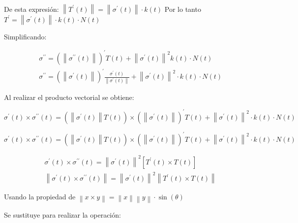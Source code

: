 De esta expresión: $\left\lVert T^{\prime}(t)\right\rVert = \left\lVert \sigma^{\prime}(t)\right\rVert \cdot k(t)$
Por lo tanto $T^{\prime}=\left\lVert \sigma^{\prime}(t)\right\rVert \cdot k(t)\cdot N(t)$

Simplificando:

\begin{align*}
	 & \sigma^{\prime\prime}=\left(\left\lVert \sigma^{\prime\prime}(t)\right\rVert \right)^{\prime}T(t)+\left\lVert \sigma^{\prime}(t)\right\rVert^{2}k(t)\cdot N(t)                                                                   \\
	 & \sigma^{\prime\prime}=\left(\left\lVert \sigma^{\prime}(t)\right\rVert \right)^{\prime}\frac{\sigma^{\prime}(t)}{\left\lVert \sigma^{\prime}(t)\right\rVert }+\left\lVert \sigma^{\prime}(t)\right\rVert^{2}\cdot k(t)\cdot N(t)
\end{align*}

Al realizar el producto vectorial se obtiene:

\begin{equation*}
	\sigma^{\prime}(t)\times \sigma^{\prime\prime}(t)=\left(\left\lVert \sigma^{\prime}(t)\right\rVert T(t)\right)\times \left(\left\lVert \sigma^{\prime}(t)\right\rVert \right)^{\prime}T(t)+\left\lVert\sigma^{\prime}(t)\right\rVert^{2}\cdot k(t)\cdot N(t)
\end{equation*}

\begin{equation*}
	\sigma^{\prime}(t)\times \sigma^{\prime\prime}(t)=\left(\left\lVert \sigma^{\prime}(t)\right\rVert T(t)\right)\times \left(\left\lVert \sigma^{\prime}(t)\right\rVert \right)^{\prime}T(t)+\left\lVert\sigma^{\prime}(t)\right\rVert^{2}\cdot k(t)\cdot N(t)
\end{equation*}

\begin{align*}
	 & \sigma^{\prime}(t)\times \sigma^{\prime\prime}(t)=\left\lVert \sigma^{\prime}(t)\right\rVert^2\left[T^{\prime}(t)\times T(t)\right]                                    \\
	 & \left\lVert\sigma^{\prime}(t)\times \sigma^{\prime\prime}(t)\right\rVert =\left\lVert \sigma^{\prime}(t)\right\rVert^2\left\lVert T^{\prime}(t)\times T(t)\right\rVert
\end{align*}

Usando la propiedad de $\left\lVert x\times y \right\rVert=\left\lVert x \right\rVert \left\lVert y \right\rVert\cdot \sin{(\theta)}$

Se sustituye para realizar la operación:

